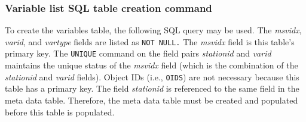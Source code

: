 \subsubsection{Variable list SQL table creation command}
\label{sec:dbvtsql}
To create the variables table, the following SQL query may be used. 
The \emph{msvidx}, \emph{varid}, and \emph{vartype} fields are listed as \texttt{NOT NULL.}  
The \emph{msvidx} field is this table's primary key.  
The \texttt{UNIQUE} command on the field pairs \emph{stationid} and \emph{varid} maintains the unique status of the \emph{msvidx} field (which is the combination of the \emph{stationid} and \emph{varid} fields).  
Object IDs (i.e., \texttt{OIDS}) are not necessary because this table has a primary key.  
The field \emph{stationid} is referenced to the same field in the meta data table.  
Therefore, the meta data table must be created and populated before this table is populated. \\

